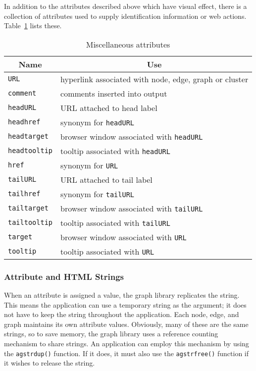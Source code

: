 In addition to the attributes described above which have visual effect,
there is a collection of attributes used to supply identification
information or web actions. Table~\ref{tab:web} lists these.
\begin{table}[htbp]\footnotesize
\centering
\begin{tabular}[t]{|l|p{3.5in}|} \hline
\multicolumn{1}{|c|}{Name} & \multicolumn{1}{c|}{Use} \\ \hline
{\tt URL} & hyperlink associated with node, edge, graph or cluster \\
{\tt comment} & comments inserted into output \\
{\tt headURL} & URL attached to head label \\
{\tt headhref} & synonym for {\tt headURL} \\
{\tt headtarget} & browser window associated with {\tt headURL} \\
{\tt headtooltip} & tooltip associated with {\tt headURL} \\
{\tt href} & synonym for {\tt URL} \\
{\tt tailURL} & URL attached to tail label \\
{\tt tailhref} & synonym for {\tt tailURL} \\
{\tt tailtarget} & browser window associated with {\tt tailURL} \\
{\tt tailtooltip} & tooltip associated with {\tt tailURL} \\
{\tt target} & browser window associated with {\tt URL} \\
{\tt tooltip} & tooltip associated with {\tt URL} \\
\hline
\end{tabular}
\caption{Miscellaneous attributes}
\label{tab:web}
\end{table}

\subsubsection{Attribute and HTML Strings}
\label{sec:attributes_strings}
When an attribute is assigned a value, the graph library replicates the
string. This means the application can use a temporary string as the
argument; it does not have to keep the string throughout the application.
Each node, edge, and graph maintains its own attribute 
values. Obviously, many of these are the same strings, so to save
memory, the graph library uses a reference counting mechanism to 
share strings. An application can employ this mechanism by using
the {\tt agstrdup()} function. If it does, it must also use the
{\tt agstrfree()} function if it wishes to release the string.

